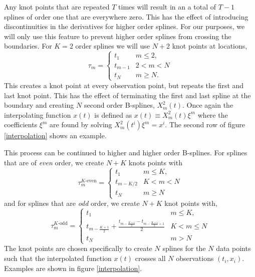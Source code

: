 \documentclass[twocol]{ametsoc}
\begin{document}
Any knot points that are repeated $T$ times will result in an a total of $T-1$ splines of order one that are everywhere zero. This has the effect of introducing discontinuities in the derivatives for higher order splines. For our purposes, we will only use this feature to prevent higher order splines from crossing the boundaries. For $K=2$ order splines we will use $N+2$ knot points at locations,
\begin{equation}
\tau_m = \begin{cases}
t_1      	& \text{$m \leq 2$}, \\
t_{m-1}	& \text{$2 < m < N$}\\
t_N 		& \text{$m \geq N$}.
\end{cases}
\end{equation}
This creates a knot point at every observation point, but repeats the first and last knot point. This has the effect of terminating the first and last spline at the boundary and creating $N$ second order B-splines, $X^2_m(t)$. Once again the interpolating function $x(t)$ is defined as $x(t) \equiv  X^2_m(t) \xi^m$ where the coefficients $\xi^m$ are found by solving $X^2_m(t^i) \xi^m = x^i$. The second row of figure \ref{interpolation} shows an example.

This process can be continued to higher and higher order B-splines. For splines that are of \emph{even} order, we create $N+K$ knots points with
\begin{equation}
\tau_m^{\text{$K$-even}} = \begin{cases}
t_1      	& \text{$m \leq K$}, \\
t_{m-K/2}	& \text{$K < m < N$}\\
t_N 		& \text{$m \geq N$}
\end{cases}
\label{even-knots}
\end{equation}
and for splines that are \emph{odd} order, we create $N+K$ knot points with,
\begin{equation}
\tau_m^{\text{$K$-odd}} = \begin{cases}
t_1      	& \text{$m \leq K$}, \\
t_{m-\frac{K+1}{2}} + \frac{t_{m-\frac{K+1}{2}}-t_{m-\frac{K+1}{2}+1}}{2}	& \text{$K < m \leq N$}\\
t_N 		& \text{$m > N$}
\end{cases}
\label{odd-knots}
\end{equation}
The knot points are chosen specifically to create $N$ splines for the $N$ data points such that the interpolated function $x(t)$ crosses all $N$ observations $(t_i,x_i)$. Examples are shown in figure \ref{interpolation}.
\end{document}
